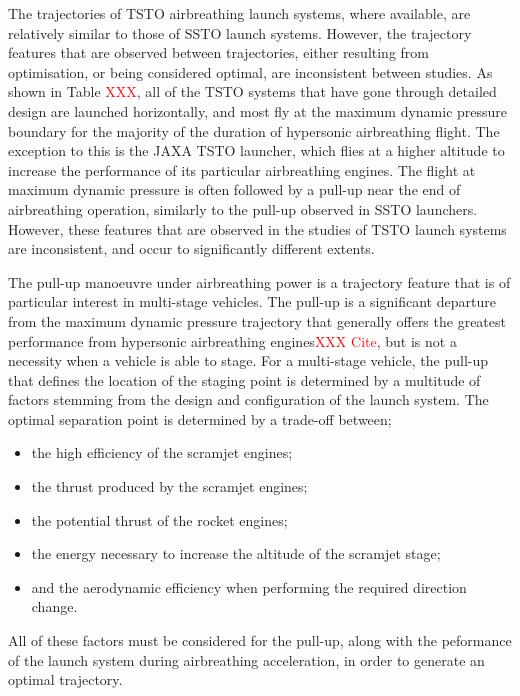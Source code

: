 The trajectories of TSTO airbreathing launch systems, where available, are relatively similar to those of SSTO launch systems. However, the trajectory features that are observed between trajectories, either resulting from optimisation, or being considered optimal, are inconsistent between studies. As shown in Table \textcolor{red}{XXX}, all of the TSTO systems that have gone through detailed design are launched horizontally, and most fly at the maximum dynamic pressure boundary for the majority of the duration of hypersonic airbreathing flight. The exception to this is the JAXA TSTO launcher, which flies at a higher altitude to increase the performance of its particular airbreathing engines. The flight at maximum dynamic pressure is often followed by a pull-up near the end of airbreathing operation, similarly to the pull-up observed in SSTO launchers. 
However, these features that are observed in the studies of TSTO launch systems are inconsistent, and occur to significantly different extents. 

The pull-up manoeuvre under airbreathing power is a trajectory feature that is of particular interest in multi-stage vehicles. The pull-up is a significant departure from the maximum dynamic pressure trajectory that generally offers the greatest performance from hypersonic airbreathing engines\textcolor{red}{XXX Cite}, but is not a necessity when a vehicle is able to stage.
For a multi-stage vehicle, the pull-up that defines the location of the staging point is determined by a multitude of factors stemming from the design and configuration of the launch system. The optimal separation point is determined by a trade-off between;
\begin{itemize}
	\item the high efficiency of the scramjet engines;
	\item the thrust produced by the scramjet engines;
	\item the potential thrust of the rocket engines;
	\item the energy necessary to increase the altitude of the scramjet stage;
	\item and the aerodynamic efficiency when performing the required direction change.
\end{itemize}
All of these factors must be considered for the pull-up, along with the peformance of the launch system during airbreathing acceleration, in order to generate an optimal trajectory. 

